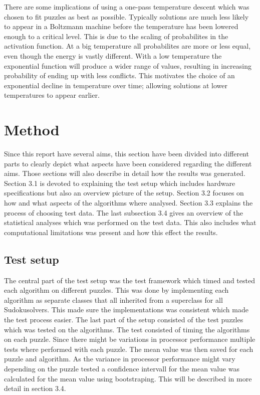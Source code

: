 \documentclass[a4paper,11pt]{kth-mag}
\begin{document}
There are some implications of using a one-pass temperature descent which was chosen to fit puzzles as best as possible.
Typically solutions are much less likely to appear in a Boltzmann machine before the temperature has been lowered enough to a critical level.
This is due to the scaling of probabilites in the activation function.
At a big temperature all probabilites are more or less equal, even though the energy is vastly different.
With a low temperature the exponential function will produce a wider range of values, resulting in increasing probability of ending up with less conflicts.
This motivates the choice of an exponential decline in temperature over time; allowing solutions at lower temperatures to appear earlier.

\chapter{Method}
Since this report have several aims, this section have been divided into different parts to clearly depict what aspects have been considered regarding the different aims. 
Those sections will also describe in detail how the results was generated. 
Section 3.1 is devoted to explaining the test setup which includes hardware specifications but also an overview picture of the setup. 
Section 3.2 focuses on how and what aspects of the algorithms where analysed.
Section 3.3 explains the process of choosing test data.
The last subsection 3.4 gives an overview of the statistical analyses which was performed on the test data.
This also includes what computational limitations was present and how this effect the results. 

\section{Test setup}
The central part of the test setup was the test framework which timed and tested each algorithm on different puzzles. 
This was done by implementing each algorithm as separate classes that all inherited from a superclass for all Sudokusolvers.
This made sure the implementations was consistent which made the test process easier.
The last part of the setup consisted of the test puzzles which was tested on the algorithms.
The test consisted of timing the algorithms on each puzzle. 
Since there might be variations in processor performance multiple tests where performed with each puzzle. 
The mean value was then saved for each puzzle and algorithm.
As the variance in processor performance might vary depending on the puzzle tested a confidence intervall for the mean value was calculated for the mean value using bootstraping. 
This will be described in more detail in section 3.4.
\end{document}
